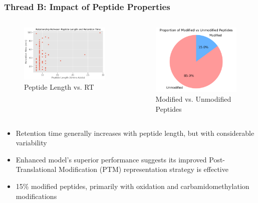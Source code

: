 \documentclass{beamer}
\begin{document}
\begin{frame}
  \frametitle{Thread B: Impact of Peptide Properties}
  \begin{columns}
      \begin{figure}
        \includegraphics[width=0.95\linewidth]{hla_uncertainty_results/enhanced_analysis/length_vs_rt.png}
        \caption{Peptide Length vs. RT}
      \end{figure}
      \begin{figure}
        \includegraphics[width=0.95\linewidth]{hla_uncertainty_results/enhanced_analysis/modified_vs_unmodified.png}
        \caption{Modified vs. Unmodified Peptides}
      \end{figure}
  \end{columns}
  \begin{itemize}
    \item Retention time generally increases with peptide length, but with considerable variability
    \item Enhanced model's superior performance suggests its improved Post-Translational Modification (PTM) representation strategy is effective
    \item 15\% modified peptides, primarily with oxidation and carbamidomethylation modifications
  \end{itemize}
\end{frame}
\end{document}
